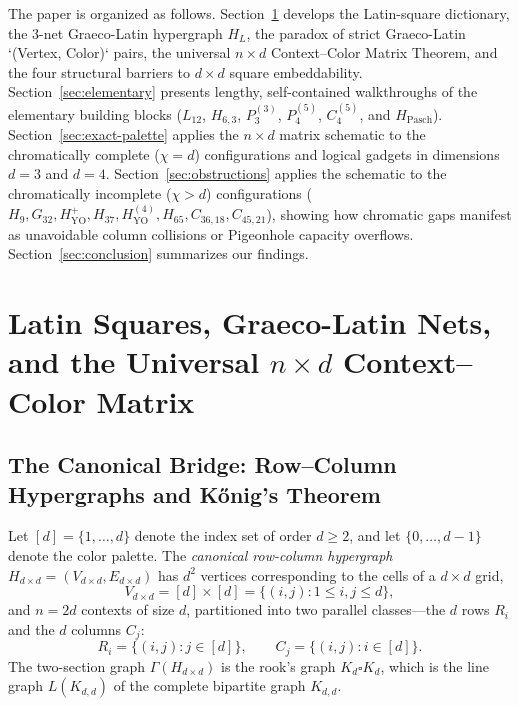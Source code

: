 \documentclass[aps,pra,reprint,superscriptaddress,longbibliography,nofootinbib,floatfix,10pt]{revtex4-2}
\theoremstyle{definition}\newtheorem{definition}[theorem]{Definition}
\theoremstyle{remark}\newtheorem{remark}[theorem]{Remark}
\newcommand{\YO}{\mathrm{YO}}\newcommand{\ip}[2]{\langle #1,#2\rangle}
\begin{document}
The paper is organized as follows. Section~\ref{sec:framework} develops the Latin-square dictionary, the $3$-net Graeco-Latin hypergraph $H_L$, the paradox of strict Graeco-Latin `(Vertex, Color)` pairs, the universal $n\times d$ Context--Color Matrix Theorem, and the four structural barriers to $d\times d$ square embeddability. Section~\ref{sec:elementary} presents lengthy, self-contained walkthroughs of the elementary building blocks ($L_{12}$, $H_{6,3}$, $P_3^{(3)}$, $P_4^{(5)}$, $C_4^{(5)}$, and $H_{\mathrm{Pasch}}$). Section~\ref{sec:exact-palette} applies the $n\times d$ matrix schematic to the chromatically complete ($\chi=d$) configurations and logical gadgets in dimensions $d=3$ and $d=4$. Section~\ref{sec:obstructions} applies the schematic to the chromatically incomplete ($\chi>d$) configurations ($H_9,G_{32},H_{\YO}^+,H_{37},H_{\YO}^{(4)},H_{65},C_{36,18},C_{45,21}$), showing how chromatic gaps manifest as unavoidable column collisions or Pigeonhole capacity overflows. Section~\ref{sec:conclusion} summarizes our findings.

\section{Latin Squares, Graeco-Latin Nets, and the Universal \texorpdfstring{$n\times d$}{n x d} Context--Color Matrix}\label{sec:framework}

\subsection{The Canonical Bridge: Row--Column Hypergraphs and K\H{o}nig's Theorem}\label{sec:row-col}

Let $[d]=\{1,\ldots,d\}$ denote the index set of order $d\ge 2$, and let $\{0,\ldots,d-1\}$ denote the color palette. The \emph{canonical row-column hypergraph} $H_{d\times d}=(V_{d\times d},E_{d\times d})$ has $d^2$ vertices corresponding to the cells of a $d\times d$ grid,
\begin{equation}\label{eq:grid-vertices}
V_{d\times d}=[d]\times[d]=\{(i,j):1\le i,j\le d\},
\end{equation}
and $n=2d$ contexts of size $d$, partitioned into two parallel classes—the $d$ rows $R_i$ and the $d$ columns $C_j$:
\begin{equation}\label{eq:grid-contexts}
R_i=\{(i,j):j\in[d]\},\qquad C_j=\{(i,j):i\in[d]\}.
\end{equation}
The two-section graph $\Gamma(H_{d\times d})$ is the rook's graph $K_d\square K_d$, which is the line graph $L(K_{d,d})$ of the complete bipartite graph $K_{d,d}$.
\end{document}
